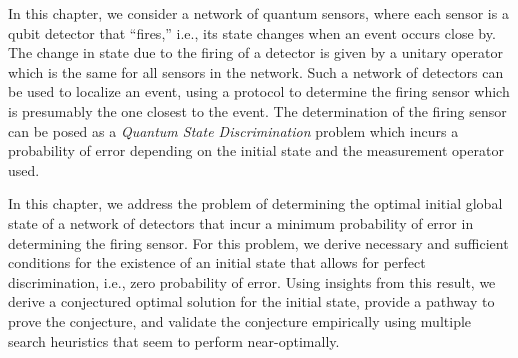 In this chapter, we consider a network of quantum sensors, where each sensor is a qubit detector that ``fires,'' i.e., its state changes when an event occurs close by. 
The change in state due to the firing of a detector is given by a unitary operator which is the same for all sensors in the network. 
Such a network of detectors can be used to localize an event, using a protocol to determine the firing sensor which is presumably the one closest to the event.
The determination of the firing sensor can be posed as a {\em Quantum State Discrimination} problem which incurs a probability of error depending on the initial state and the measurement operator used. 

In this chapter, we address the problem of determining the optimal initial global state of a network of detectors that incur a minimum probability of error in determining the firing sensor. For this problem, we derive necessary and sufficient conditions for the existence of an initial state that allows for perfect discrimination, i.e., zero probability of error. 
Using insights from this result, we derive a conjectured optimal solution for the initial state, provide a pathway to prove the conjecture, and validate the conjecture empirically using multiple search heuristics that seem to perform near-optimally. 
